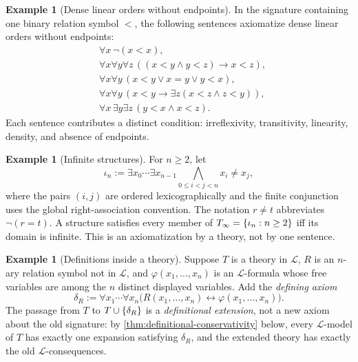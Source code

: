 \documentclass[11pt,oneside,openany]{book}
\theoremstyle{definition}
\newtheorem{example}[definition]{Example}
\theoremstyle{plain}
\theoremstyle{remark}
\DeclarePairedDelimiter{\set}{\lbrace}{\rbrace}
\newcommand{\Lang}{\mathcal{L}}
\newcommand{\defeq}{\mathrel{:=}}
\begin{document}
\begin{example}[Dense linear orders without endpoints]
In the signature containing one binary relation symbol \(<\), the following
sentences axiomatize dense linear orders without endpoints:
\[
\begin{aligned}
&\forall x\,\neg(x<x),\\
&\forall x\forall y\forall z\,
  ((x<y\land y<z)\to x<z),\\
&\forall x\forall y\,(x<y\lor x=y\lor y<x),\\
&\forall x\forall y\,(x<y\to\exists z(x<z\land z<y)),\\
&\forall x\,\exists y\exists z\,(y<x\land x<z).
\end{aligned}
\]
Each sentence contributes a distinct condition: irreflexivity, transitivity,
linearity, density, and absence of endpoints.
\end{example}

\begin{example}[Infinite structures]
For \(n\geq2\), let
\[
 \iota_n\defeq
 \exists x_0\cdots\exists x_{n-1}
 \bigwedge_{0\leq i<j<n}x_i\ne x_j,
\]
where the pairs \((i,j)\) are ordered lexicographically and the finite
conjunction uses the global right-association convention.  The notation
\(r\ne t\) abbreviates \(\neg(r=t)\).  A structure satisfies every
member of \(T_\infty=\set{\iota_n:n\geq2}\) iff its domain is
infinite.  This is an axiomatization by a theory, not by one sentence.
\end{example}

\begin{example}[Definitions inside a theory]
Suppose \(T\) is a theory in \(\Lang\), \(R\) is an \(n\)-ary relation
symbol not in \(\Lang\), and \(\varphi(x_1,\ldots,x_n)\) is an
\(\Lang\)-formula whose free variables are among the \(n\) distinct
displayed variables.  Add the \emph{defining axiom}
\[
 \delta_R\defeq
 \forall x_1\cdots\forall x_n
 \bigl(R(x_1,\ldots,x_n)\leftrightarrow
       \varphi(x_1,\ldots,x_n)\bigr).
\]
The passage from \(T\) to \(T\cup\set{\delta_R}\) is a
\emph{definitional extension}, not a new axiom about the old signature:
by \cref{thm:definitional-conservativity} below, every \(\Lang\)-model of
\(T\) has exactly one expansion satisfying \(\delta_R\), and the extended
theory has exactly the old \(\Lang\)-consequences.
\end{example}
\end{document}
